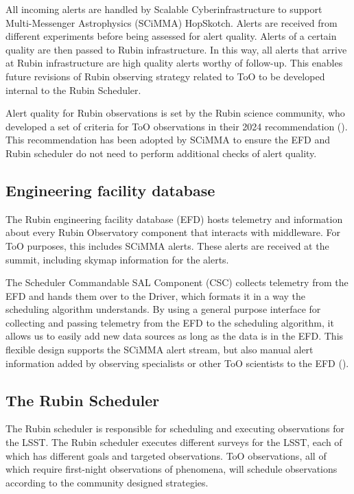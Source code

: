 All incoming alerts are handled by Scalable Cyberinfrastructure to support Multi-Messenger Astrophysics (SCiMMA) HopSkotch. Alerts are received from different experiments before being assessed for alert quality. Alerts of a certain quality are then passed to Rubin infrastructure. In this way, all alerts that arrive at Rubin infrastructure are high quality alerts worthy of follow-up. This enables future revisions of Rubin observing strategy related to ToO to be developed internal to the Rubin Scheduler.

Alert quality for Rubin observations is set by the Rubin science community, who developed a set of criteria for ToO observations in their 2024 recommendation (\cite{RubinToO2024}). This recommendation has been adopted by SCiMMA to ensure the EFD and Rubin scheduler do not need to perform additional checks of alert quality.

\subsection{Engineering facility database}\label{subsec:EFD}

The Rubin engineering facility database (EFD) hosts telemetry and information about every Rubin Observatory component that interacts with middleware. For ToO purposes, this includes SCiMMA alerts. These alerts are received at the summit, including skymap information for the alerts. 

The Scheduler Commandable SAL Component (CSC) collects telemetry from the EFD and hands them over to the Driver, which formats it in a way the scheduling algorithm understands. By using a general purpose interface for collecting and passing telemetry from the EFD to the scheduling algorithm, it allows us to easily add new data sources as long as the data is in the EFD. This flexible design supports the SCiMMA alert stream, but also manual alert information added by observing specialists or other ToO scientists to the EFD (\cite{TSTN-035}). 

\subsection{The Rubin Scheduler}\label{subsec:Scheduler}

The Rubin scheduler is responsible for scheduling and executing observations for the LSST. The Rubin scheduler executes different surveys for the LSST, each of which has different goals and targeted observations. ToO observations, all of which require first-night observations of phenomena, will schedule observations according to the community designed strategies. 



